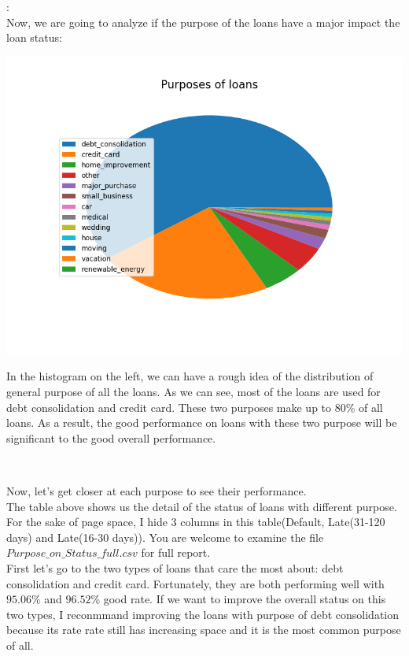 \documentclass[10pt]{article}
\newenvironment{sect}[2][Section]{\begin{trivlist}
\item[\hskip \labelsep {\bfseries #2}]}{\end{trivlist}}
\begin{document}
\begin{sect}{Genral Purpose}
:\\
Now, we are going to analyze if the purpose of the loans have a major impact the loan status:\\
\begin{minipage}{0.5\textwidth}
\includegraphics[width=\textwidth]{purpose_pie_chart.png}
\end{minipage}
\begin{minipage}{0.5\textwidth}
In the histogram on the left, we can have a rough idea of the distribution of general purpose of all the loans. As we can see, most of the loans are used for debt consolidation and credit card. These two purposes make up to 80\% of all loans. As a result, the good performance on loans with these two purpose will be significant to the good overall performance.
\end{minipage}
\begin{center}
\footnotesize{}\\
\end{center}
\normalsize
Now, let's get closer at each purpose to see their performance.\\
The table above shows us the detail of the status of loans with different purpose. For the sake of page space, I hide 3 columns in this table(Default, Late(31-120 days) and Late(16-30 days)). You are welcome to examine the file $Purpose\_on\_Status\_full.csv$ for full report.\\
First let's go to the two types of loans that care the most about: debt consolidation and credit card. Fortunately, they are both performing well with $95.06\%$ and $96.52\%$ good rate. If we want to improve the overall status on this two types, I reconmmand improving the loans with purpose of debt consolidation because its rate rate still has increasing space and it is the most common purpose of all.\\

\end{sect}
\end{document}
